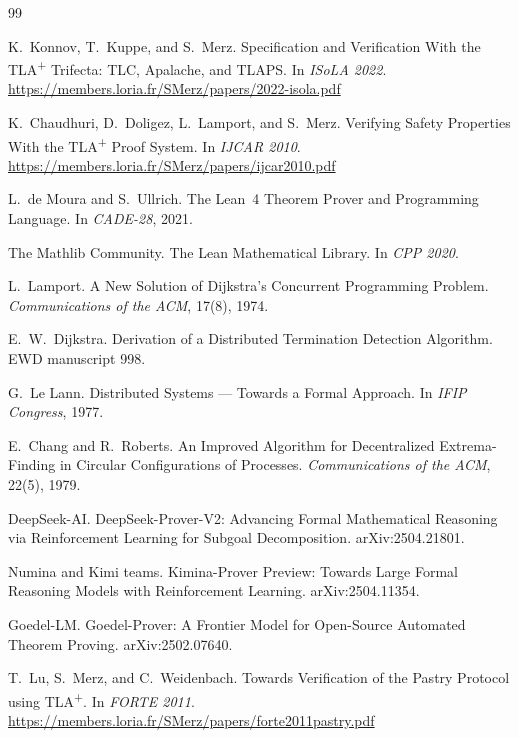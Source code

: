 \documentclass[11pt,a4paper]{article}
\begin{document}
\begin{thebibliography}{99}
\small

K.~Konnov, T.~Kuppe, and S.~Merz.
\newblock Specification and Verification With the TLA\textsuperscript{+} Trifecta: TLC, Apalache, and
TLAPS.
\newblock In \emph{ISoLA 2022}. \url{https://members.loria.fr/SMerz/papers/2022-isola.pdf}

K.~Chaudhuri, D.~Doligez, L.~Lamport, and S.~Merz.
\newblock Verifying Safety Properties With the TLA\textsuperscript{+} Proof System.
\newblock In \emph{IJCAR 2010}. \url{https://members.loria.fr/SMerz/papers/ijcar2010.pdf}

L.~de Moura and S.~Ullrich.
\newblock The Lean~4 Theorem Prover and Programming Language.
\newblock In \emph{CADE-28}, 2021.

The Mathlib Community.
\newblock The Lean Mathematical Library.
\newblock In \emph{CPP 2020}.

L.~Lamport.
\newblock A New Solution of Dijkstra's Concurrent Programming Problem.
\newblock \emph{Communications of the ACM}, 17(8), 1974.

E.~W.~Dijkstra.
\newblock Derivation of a Distributed Termination Detection Algorithm.
\newblock EWD manuscript 998.

G.~Le Lann.
\newblock Distributed Systems --- Towards a Formal Approach.
\newblock In \emph{IFIP Congress}, 1977.

E.~Chang and R.~Roberts.
\newblock An Improved Algorithm for Decentralized Extrema-Finding in Circular Configurations of
Processes.
\newblock \emph{Communications of the ACM}, 22(5), 1979.

DeepSeek-AI.
\newblock DeepSeek-Prover-V2: Advancing Formal Mathematical Reasoning via Reinforcement Learning for
Subgoal Decomposition.
\newblock arXiv:2504.21801.

Numina and Kimi teams.
\newblock Kimina-Prover Preview: Towards Large Formal Reasoning Models with Reinforcement Learning.
\newblock arXiv:2504.11354.

Goedel-LM.
\newblock Goedel-Prover: A Frontier Model for Open-Source Automated Theorem Proving.
\newblock arXiv:2502.07640.

T.~Lu, S.~Merz, and C.~Weidenbach.
\newblock Towards Verification of the Pastry Protocol using TLA\textsuperscript{+}.
\newblock In \emph{FORTE 2011}. \url{https://members.loria.fr/SMerz/papers/forte2011pastry.pdf}


\end{thebibliography}
\end{document}
